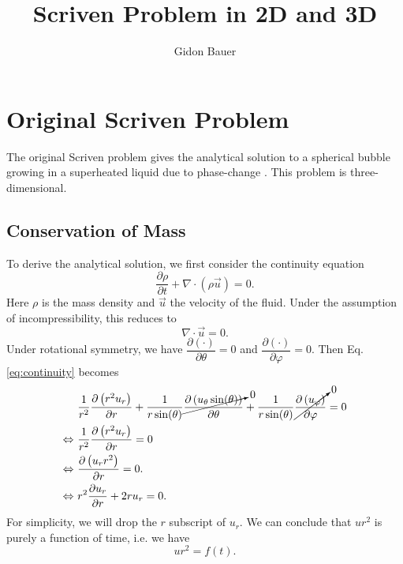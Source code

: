 \documentclass{article}
\title{Scriven Problem in 2D and 3D}
\author{Gidon Bauer}
\numberwithin{equation}{section}
\newcommand{\pd}[2]{\dfrac{\partial #1}{\partial #2}}
\begin{document}
\maketitle

\section{Original Scriven Problem}

The original Scriven problem gives the analytical solution to a spherical bubble growing in a superheated liquid due to phase-change \cite{scrivenDynamicsPhaseGrowth1995}.
This problem is three-dimensional.

\subsection{Conservation of Mass}
To derive the analytical solution, we first consider the continuity equation
\begin{equation}
    \pd{\rho}{t} + \nabla \cdot \left(\rho \vec{u}\right) = 0.
\end{equation}
Here $\rho$ is the mass density and $\vec{u}$ the velocity of the fluid.
Under the assumption of incompressibility, this reduces to
\begin{equation}
    \nabla \cdot \vec{u} = 0.
    \label{eq:continuity}
\end{equation}
Under rotational symmetry, we have $\pd{(\cdot)}{\theta} = 0$ and $\pd{(\cdot)}{\varphi} = 0$.
Then Eq. \eqref{eq:continuity} becomes
\begin{equation}
    \begin{split}
        &\frac{1}{r^2} \pd{\left(r^2 u_r\right)}{r}
        + \frac{1}{r \sin(\theta)} \cancelto{0}{\pd{\left(u_\theta \sin(\theta)\right)}{\theta}}
        + \frac{1}{r \sin(\theta)} \cancelto{0}{\pd{\left(u_\varphi\right)}{\varphi}}
        = 0 \\
        \Leftrightarrow\ &\frac{1}{r^2} \pd{\left(r^2 u_r\right)}{r} = 0 \\
        \Leftrightarrow\ &\pd{\left(u_r r^2\right)}{r} = 0. \\
        \Leftrightarrow\ &r^2 \pd{u_r}{r} + 2ru_r = 0.
    \end{split}
\end{equation}
For simplicity, we will drop the $r$ subscript of $u_r$.
We can conclude that $u r^2$ is purely a function of time, i.e. we have
\begin{equation}
    u r^2 = f(t).
    \label{eq:velocity_radius_constraint}
\end{equation}
\end{document}
